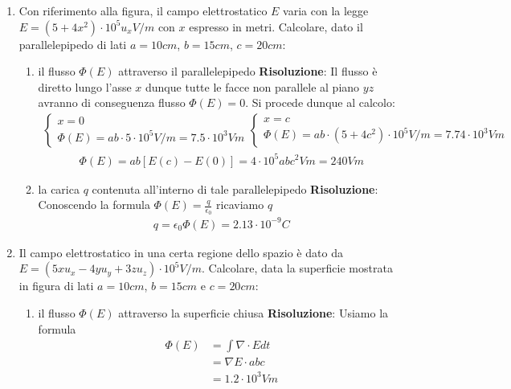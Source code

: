 \documentclass{book}
\begin{document}
\begin{enumerate}
    \item Con riferimento alla figura, il campo elettrostatico $E$ varia con la legge $E = (5 + 4x^2) \cdot 10^5 u_x V/m$ con $x$ espresso in metri. Calcolare, dato il parallelepipedo di lati $a = 10 cm$, $b = 15 cm$, $c = 20 cm$: 
    \begin{enumerate}
        \item il flusso $\Phi (E)$ attraverso il parallelepipedo
        \newline 
        \textbf{Risoluzione}: Il flusso è diretto lungo l'asse $x$ dunque tutte le facce non parallele al piano $yz$ avranno di conseguenza flusso $\Phi(E) = 0$. Si procede dunque al calcolo:
        \begin{align*}
            \begin{cases}
                x=0 \\
                \Phi(E) = ab \cdot 5 \cdot 10^5 V/m = 7.5 \cdot 10^3 Vm
            \end{cases}
            \begin{cases}
                x = c\\
                \Phi(E) = ab \cdot (5 + 4c^2) \cdot 10^5 V/m = 7.74 \cdot 10^3 Vm
             \end{cases}
        \end{align*}
        \begin{align*}
            \Phi(E) = ab[E(c) - E(0)] = 4 \cdot 10^5 abc^2 Vm = 240Vm
        \end{align*}

        \item la carica $q$ contenuta all’interno di tale parallelepipedo
        \newline 
        \textbf{Risoluzione}: Conoscendo la formula $\Phi(E) = \frac{q}{\epsilon_0}$ ricaviamo $q$
        \begin{align*}
            q = \epsilon_0 \Phi(E) = 2.13 \cdot 10^{-9} C
        \end{align*}
    \end{enumerate}
   
    \item Il campo elettrostatico in una certa regione dello spazio è dato da $E = (5xu_x - 4yu_y + 3zu_z) \cdot 10^5 V/m$. Calcolare, data la superficie  mostrata in figura di lati $a = 10 cm$, $b = 15 cm$ e $c = 20 cm$: 
    \begin{enumerate}
        \item il flusso $\Phi(E)$ attraverso la superficie chiusa
        \newline 
        \textbf{Risoluzione}: Usiamo la formula 
        \begin{align*}
            \Phi(E) & = \int \nabla \cdot E dt \\
                    & = \nabla E \cdot abc \\
                    & = 1.2 \cdot 10^3 Vm
        \end{align*}


\end{enumerate}
\end{enumerate}
\end{document}
